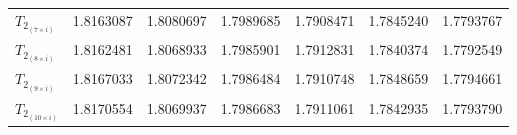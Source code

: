 \begin{table*}[t!]
\begin{tabular}{l*{6}{c}}
        $T_{2_{(7 \times i)}}$ & 1.8163087 & 1.8080697          & 1.7989685          & 1.7908471 & 1.7845240 & 1.7793767                  \\[+0.5ex]
        $T_{2_{(8 \times i)}}$ & 1.8162481 & 1.8068933          & 1.7985901          & 1.7912831 & 1.7840374 & 1.7792549                  \\[+0.5ex]
        $T_{2_{(9 \times i)}}$ & 1.8167033 & 1.8072342          & 1.7986484          & 1.7910748 & 1.7848659 & 1.7794661                  \\[+0.5ex]
        $T_{2_{(10\times i)}}$ & 1.8170554 & 1.8069937          & 1.7986683          & 1.7911061 & 1.7842935 & 1.7793790                  \\[+0.5ex]
        \hline
    \end{tabular}
\end{table*}
